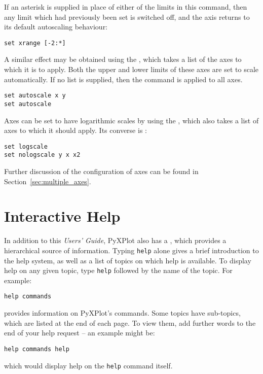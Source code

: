 If an asterisk is supplied in place of either of the limits in this command, then
any limit which had previously been set is switched off, and the axis returns to
its default autoscaling behaviour:

\begin{verbatim}
set xrange [-2:*]
\end{verbatim}

\noindent A similar effect may be obtained using the ,
which takes a list of the axes to which it is to apply. Both the upper and
lower limits of these axes are set to scale automatically. If no list is
supplied, then the command is applied to all axes.

\begin{verbatim}
set autoscale x y
set autoscale
\end{verbatim}

Axes can be set to have logarithmic scales by using the ,
which also takes a list of axes to which it should apply. Its converse is
:

\begin{verbatim}
set logscale
set nologscale y x x2
\end{verbatim}

Further discussion of the configuration of axes can be found in
Section~\ref{sec:multiple_axes}.

\section{Interactive Help}

In addition to this {\it Users' Guide}, PyXPlot also has a ,
which provides a hierarchical source of information. Typing {\tt help} alone
gives a brief introduction to the help system, as well as a list of topics on
which help is available. To display help on any given topic, type {\tt help}
followed by the name of the topic. For example:

\begin{verbatim}
help commands
\end{verbatim}

\noindent provides information on PyXPlot's commands. Some topics have
sub-topics, which are listed at the end of each page. To view them, add further
words to the end of your help request -- an example might be:

\begin{verbatim}
help commands help
\end{verbatim}

\noindent which would display help on the {\tt help} command itself.

